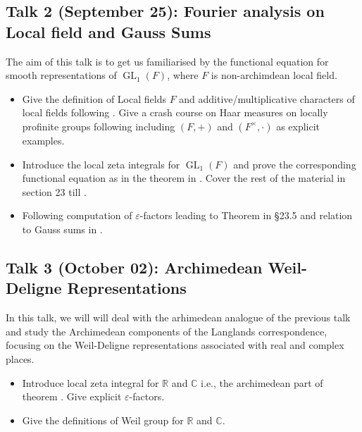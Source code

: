 \documentclass[11pt]{amsart}
\DeclareMathOperator{\Gl}{GL}
\newcommand{\R}{\mathbb{R}}
\newcommand{\C}{\mathbb{C}}
\begin{document}
\subsection{Talk 2 (September 25): Fourier analysis on Local field and Gauss Sums}
The aim of this talk is to get us familiarised by the functional equation for smooth representations of $\Gl_1(F)$, where $F$ is non-archimdean local field. 
\begin{itemize}
    \item Give the definition of Local fields $F$ and additive/multiplicative characters of local fields following \cite[\S 1.1 - 1.4, \S 1.6-1.8]{BH06}. Give a crash course on Haar measures on locally profinite groups following \cite[\S 3.1-3.4]{BH06} including $(F,+)$ and $(F^\times,\cdot)$ as explicit examples.
    
    \item Introduce the local zeta integrals for $\Gl_1(F)$ and prove the corresponding functional equation as in the theorem in \cite[\S 23.1-23.2]{BH06}. Cover the rest of the material in section 23 till \cite[\S 23.4]{BH06}.

    \item Following \cite[\S 23.5-23.7]{BH06} computation of $\varepsilon$-factors leading to Theorem in \S 23.5 and relation to Gauss sums in \cite[\S 23.6]{BH06}.
    
\end{itemize}

\subsection{Talk 3 (October 02): Archimedean Weil-Deligne Representations}
In this talk, we will will deal with the arhimedean analogue of the previous talk and study the Archimedean components of the Langlands correspondence, focusing on the Weil-Deligne representations associated with real and complex places.
    \begin{itemize}
        \item Introduce local zeta integral for $\R$ and $\C$ i.e., the archimedean part of theorem \cite[Ch 7, Thm 7.2]{RV99}. Give explicit $\varepsilon$-factors. 
        \item Give the definitions of Weil group for $\R$ and $\C$. 
    \end{itemize}
\end{document}
